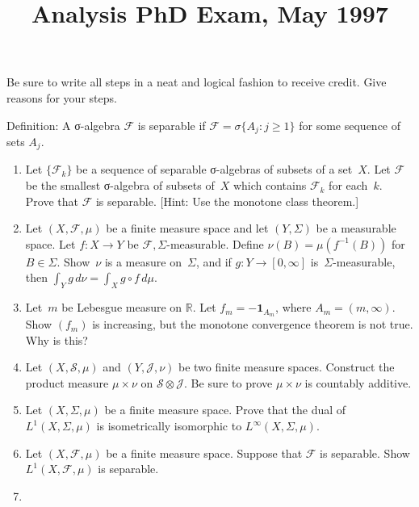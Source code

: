 \documentclass[11pt,letterpaper]{article}
\title{Analysis PhD Exam, May 1997}
\author{}
\date{}
\newenvironment{examproblems}[2]{%
  \def\ProblemHeadingTag{#2}%
  \AssignTaggingSocketPlug{block/list/label}{examproblem}%
  \begin{enumerate}%
  \setcounter{enumi}{#1}%
  \renewcommand{\labelenumi}{\textbf{\theenumi.}}%
  \setlength{\topsep}{0.35em}%
  \setlength{\partopsep}{0pt}%
  \setlength{\itemsep}{0.48em}%
  \setlength{\parsep}{0.18em}%
}{\end{enumerate}}
\newenvironment{examinstructions}{%
  \par\begingroup\itshape
}{%
  \par\endgroup\vspace{0.18em}
}
\begin{document}
\maketitle
\thispagestyle{empty}
\begin{examinstructions}
Be sure to write all steps in a neat and logical fashion to receive credit. Give reasons for your steps.

\par
Definition: A σ-algebra \(\mathcal F\) is separable if \(\mathcal F=\sigma\{A_j:j\geq 1\}\) for some sequence of sets \(A_j\).
\end{examinstructions}
\begin{examproblems}{0}{H2}
\def\ProblemHeadingText{Problem 1.}
\item
Let \(\{\mathcal F_k\}\) be a sequence of separable σ-algebras of subsets of a set~\(X\). Let \(\mathcal F\) be the smallest σ-algebra of subsets of~\(X\) which contains \(\mathcal F_k\) for each~\(k\). Prove that \(\mathcal F\) is separable. [Hint: Use the monotone class theorem.]
\def\ProblemHeadingText{Problem 2.}
\item
Let \((X,\mathcal F,\mu)\) be a finite measure space and let \((Y,\Sigma)\) be a measurable space. Let \(f:X\to Y\) be \(\mathcal F,\Sigma\)-measurable. Define \(\nu(B)=\mu(f^{-1}(B))\) for \(B\in\Sigma\). Show~\(\nu\) is a measure on~\(\Sigma\), and if \(g:Y\to[0,\infty]\) is~\(\Sigma\)-measurable, then \(\int_Y g\,d\nu=\int_X g\circ f\,d\mu\).
\def\ProblemHeadingText{Problem 3.}
\item
Let~\(m\) be Lebesgue measure on \(\mathbb R\). Let \(f_m=-\mathbf 1_{A_m}\), where \(A_m=(m,\infty)\). Show \((f_m)\) is increasing, but the monotone convergence theorem is not true. Why is this?
\def\ProblemHeadingText{Problem 4.}
\item
Let \((X,\mathcal S,\mu)\) and \((Y,\mathcal J,\nu)\) be two finite measure spaces. Construct the product measure \(\mu\times\nu\) on \(\mathcal S\otimes\mathcal J\). Be sure to prove \(\mu\times\nu\) is countably additive.
\def\ProblemHeadingText{Problem 5.}
\item
Let \((X,\Sigma,\mu)\) be a finite measure space. Prove that the dual of \(L^1(X,\Sigma,\mu)\) is isometrically isomorphic to \(L^\infty(X,\Sigma,\mu)\).
\def\ProblemHeadingText{Problem 6.}
\item
Let \((X,\mathcal F,\mu)\) be a finite measure space. Suppose that \(\mathcal F\) is separable. Show \(L^1(X,\mathcal F,\mu)\) is separable.
\def\ProblemHeadingText{Problem 7.}
\item

\end{examproblems}
\end{document}

